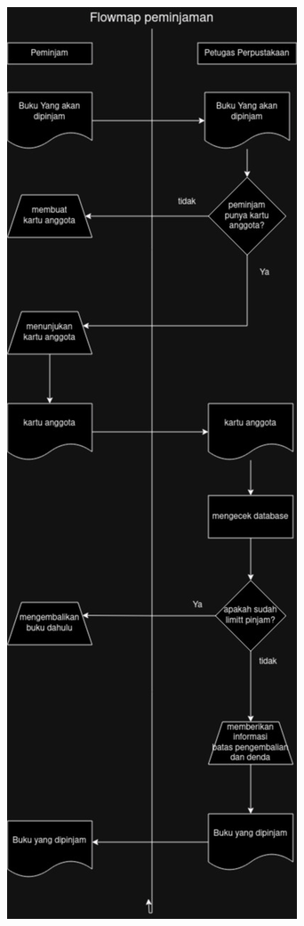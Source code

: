 \documentclass[a4paper,12 pt]{article}
\begin{document}
\begin{center}
  \includegraphics{Picture2}
\end{center}
\end{document}
